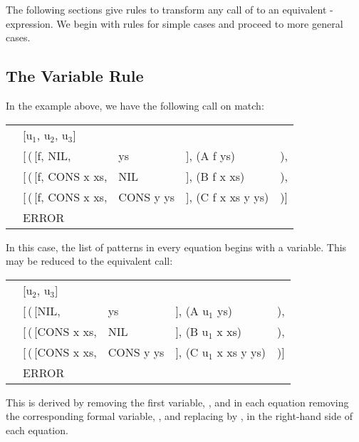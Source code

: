 The following sections give rules to transform any call of  to an
equivalent -expression. We begin with rules for simple cases and proceed to more general cases.

\subsection{The Variable Rule}

In the example above, we have the following call on match:
\begin{mlcoded}
    \setlength{\tabcolsep}{0.25em}
    \begin{tabular}{lllll}
        \metafn{match} &[u$_1$, u$_2$, u$_3$] &&&\\
        &[\,(\,[f,\! NIL, &ys &],\! (A\! f\! ys) &),\! \\
        &[\,(\,[f,\! CONS\! x\! xs,\! &NIL &],\! (B\! f\! x\! xs)&), \\
        &[\,(\,[f,\! CONS\! x\! xs,\! &CONS\! y\! ys\! &],\! (C\! f\! x\! xs\! y\! ys)&)] \\
        &ERROR &&&
    \end{tabular}
\end{mlcoded}
In this case, the list of patterns in every equation begins with a variable. This may be reduced to the equivalent call:
\begin{mlcoded}
    \setlength{\tabcolsep}{0.25em}
    \begin{tabular}{lllll}
        \metafn{match} &[u$_2$, u$_3$] &&&\\
        &[\,(\,[NIL, &ys &],\! (A\! u$_1$\! ys) &),\! \\
        &[\,(\,[CONS\! x\! xs,\! &NIL &],\! (B\! u$_1$\! x\! xs)&), \\
        &[\,(\,[CONS\! x\! xs,\! &CONS\! y\! ys\! &],\! (C\! u$_1$\! x\! xs\! y\! ys)&)] \\
        &ERROR &&&
    \end{tabular}
\end{mlcoded}
This is derived by removing the first variable, , and in each equation removing the corresponding formal variable, , and replacing  by , in the right-hand side of each equation.

